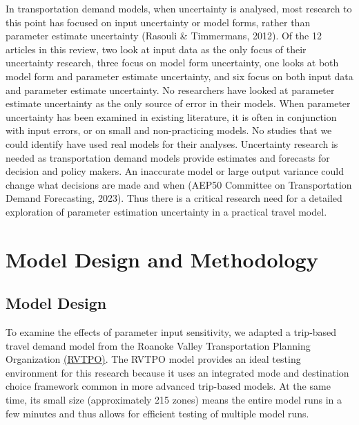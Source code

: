 \documentclass[
  letterpaper,
  authoryear,
  review,
  3p]{elsarticle}
\begin{document}
In transportation demand models, when uncertainty is analysed, most
research to this point has focused on input uncertainty or model forms,
rather than parameter estimate uncertainty (Rasouli \& Timmermans,
2012). Of the 12 articles in this review, two look at input data as the
only focus of their uncertainty research, three focus on model form
uncertainty, one looks at both model form and parameter estimate
uncertainty, and six focus on both input data and parameter estimate
uncertainty. No researchers have looked at parameter estimate
uncertainty as the only source of error in their models. When parameter
uncertainty has been examined in existing literature, it is often in
conjunction with input errors, or on small and non-practicing models. No
studies that we could identify have used real models for their analyses.
Uncertainty research is needed as transportation demand models provide
estimates and forecasts for decision and policy makers. An inaccurate
model or large output variance could change what decisions are made and
when (AEP50 Committee on Transportation Demand Forecasting, 2023). Thus
there is a critical research need for a detailed exploration of
parameter estimation uncertainty in a practical travel model.


\hypertarget{sec-methods}{%
\section{Model Design and Methodology}\label{sec-methods}}

\hypertarget{model-design}{%
\subsection{Model Design}\label{model-design}}

To examine the effects of parameter input sensitivity, we adapted a
trip-based travel demand model from the Roanoke Valley Transportation
Planning Organization
\href{https://github.com/xinwangvdot/rvtpo}{(RVTPO)}. The RVTPO model
provides an ideal testing environment for this research because it uses
an integrated mode and destination choice framework common in more
advanced trip-based models. At the same time, its small size
(approximately 215 zones) means the entire model runs in a few minutes
and thus allows for efficient testing of multiple model runs.
\end{document}
